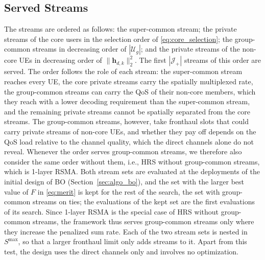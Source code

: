 \subsection{Served Streams}
The streams are ordered as follows: the super-common stream; the private streams of the core users in the selection order of \eqref{eq:core_selection}; the group-common streams in decreasing order of $|\mathcal U_g|$; and the private streams of the non-core UEs in decreasing order of $\|\mathbf h_{d,k}\|_2^2$. The first $|\mathcal J_+|$ streams of this order are served. The order follows the role of each stream: the super-common stream reaches every UE, the core private streams carry the spatially multiplexed rate, the group-common streams can carry the QoS of their non-core members, which they reach with a lower decoding requirement than the super-common stream, and the remaining private streams cannot be spatially separated from the core streams. The group-common streams, however, take fronthaul slots that could carry private streams of non-core UEs, and whether they pay off depends on the QoS load relative to the channel quality, which the direct channels alone do not reveal. Whenever the order serves group-common streams, we therefore also consider the same order without them, i.e., HRS without group-common streams, which is 1-layer RSMA. Both stream sets are evaluated at the deployments of the initial design of BO (Section~\ref{sec:algo_bo}), and the set with the larger best value of $F$ in \eqref{eq:merit} is kept for the rest of the search, the set with group-common streams on ties; the evaluations of the kept set are the first evaluations of its search. Since 1-layer RSMA is the special case of HRS without group-common streams, the framework thus serves group-common streams only where they increase the penalized sum rate. Each of the two stream sets is nested in $S^{\max}$, so that a larger fronthaul limit only adds streams to it. Apart from this test, the design uses the direct channels only and involves no optimization.

